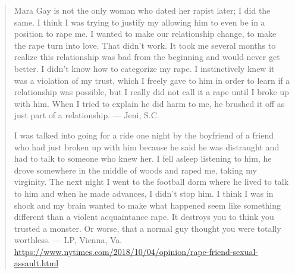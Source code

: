 \documentclass[11pt]{article}
\begin{document}
\begin{quote}
Mara Gay is not the only woman who dated her rapist later; I did the same. I think I was trying to justify my allowing him to even be in a position to rape me. I wanted to make our relationship change, to make the rape turn into love. That didn’t work. It took me several months to realize this relationship was bad from the beginning and would never get better. I didn’t know how to categorize my rape. I instinctively knew it was a violation of my trust, which I freely gave to him in order to learn if a relationship was possible, but I really did not call it a rape until I broke up with him. When I tried to explain he did harm to me, he brushed it off as just part of a relationship. — Jeni, S.C.

I was talked into going for a ride one night by the boyfriend of a friend who had just broken up with him because he said he was distraught and had to talk to someone who knew her. I fell asleep listening to him, he drove somewhere in the middle of woods and raped me, taking my virginity. The next night I went to the football dorm where he lived to talk to him and when he made advances, I didn’t stop him. I think I was in shock and my brain wanted to make what happened seem like something different than a violent acquaintance rape. It destroys you to think you trusted a monster. Or worse, that a normal guy thought you were totally worthless. — LP, Vienna, Va.
\url{https://www.nytimes.com/2018/10/04/opinion/rape-friend-sexual-assault.html}
\end{quote}

\end{document}
